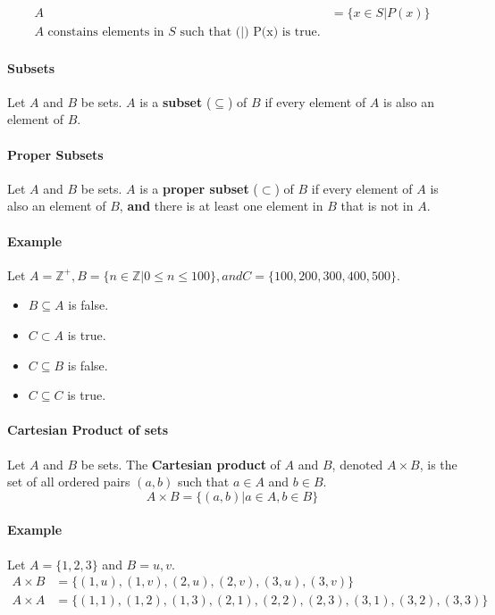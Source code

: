\begin{align*}
    A &= \{x\in S | P(x)\} \\
    \text{$A$ constains elements in $S$ such that (|) P(x) is true.}
\end{align*}

\paragraph*{Subsets}
Let $A$ and $B$ be sets. $A$ is a \textbf{subset} ($\subseteq$) of $B$ if every element of $A$ is also an element of $B$.\\

\paragraph*{Proper Subsets}
Let $A$ and $B$ be sets. $A$ is a \textbf{proper subset} ($\subset$) of $B$ if every element of $A$ is also an element of $B$, \textbf{and} 
there is at least one element in $B$ that is not in $A$.\\

\paragraph*{Example}
Let $A = \mathbb{Z^+}, B = \{n\in\mathbb{Z}|0\leq n\leq 100\}, and C = \{100,200,300,400,500\}$.
\begin{itemize}
    \item $B \subseteq A$ is false.
    \item $C \subset A$ is true.
    \item $C \subseteq B$ is false.
    \item $C \subseteq C$ is true.
\end{itemize}

\paragraph*{Cartesian Product of sets}
Let $A$ and $B$ be sets. The \textbf{Cartesian product} of $A$ and $B$, denoted $A\times B$, is the set of all ordered pairs $(a,b)$ such that $a\in A$ and $b\in B$.\\
\begin{equation*}
    A\times B = \{(a,b)|a\in A, b\in B\}
\end{equation*} 

\paragraph*{Example}
Let $A = \{1,2,3\}$ and $B = {u,v}$.
\begin{align*}
    A\times B &= \{(1,u),(1,v),(2,u),(2,v),(3,u),(3,v)\}\\
    A\times A &= \{(1,1),(1,2),(1,3),(2,1),(2,2),(2,3),(3,1),(3,2),(3,3)\}
\end{align*}